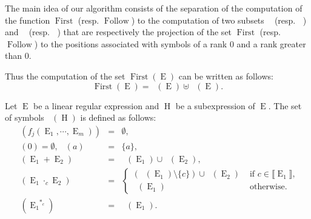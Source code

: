 \documentclass{llncs}
\DeclareMathOperator{\last}{Fl_0}
\DeclareMathOperator{\Follw}{Fl_>}
\DeclareMathOperator{\First}{First}
\DeclareMathOperator{\Follow}{Follow}
\DeclareMathOperator{\E}{E}
\DeclareMathOperator{\h}{H}
\DeclareMathOperator{\Fir}{Fr_>}
\DeclareMathOperator{\Firs}{Fr_0}
\def\first#1{\First{(#1)}}
\def\firstt#1{\Fir{(#1)}}
\def\firs#1{\Firs{(#1)}}
\begin{document}
The main idea of our algorithm consists of the separation of the computation of the function $\First$ (resp. $\Follow$) to the computation of two subsets $\Firs$ (resp. $\last$) and $\Fir$ (resp. $\Follw$) that are respectively  
the projection of the set $\First$ (resp. $\Follow$) to the positions associated with
symbols of a rank $0$ and a rank greater than $0$.

Thus the computation of the set $\first{\E}$ can be written as follows:  
 $$\first{\E}=\firs{\E}\uplus\firstt{\E}.$$


\begin{proposition}
 \label{s}
Let $\E$ be a linear regular expression and $\h$ be a subexpression of $\E$. The set of symbols $\firs{\h}$ is defined as follows:
\begin{eqnarray*}
\firs{f_j(\E_1, \cdots,\E_m)}&=&\emptyset,\\
\firs{0}=\emptyset,\ \firs{a}&=& \{a\},\\
\firs{\E_1+\E_2}&=&\firs{\E_1}\cup\firs{\E_2},\\
\firs{{\E_1}\cdot_c \E_2}&=&\left\{
\begin{array}{ll}
(\firs{\E_1}\setminus\{c\})\cup\firs{\E_2}&\mbox{ if  }c\in\llbracket\E_1\rrbracket,\\
\firs{\E_1}&\mbox{ otherwise.}
\end{array}\right.\\
\firs{{\E_1}^{*_c}}&=&\firs{\E_1}.
\end{eqnarray*}
\end{proposition}
\end{document}
